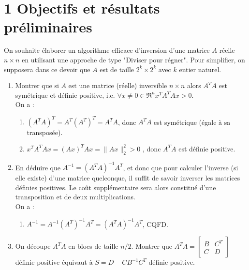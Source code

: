 \documentclass[a4paper,fleqn]{article}
\begin{document}
\section*{1 Objectifs et résultats préliminaires}

On souhaite élaborer un algorithme efficace d'inversion d'une matrice $A$ réelle $n \times n$ en utilisant une approche de type "Diviser pour régner". Pour simplifier, on supposera dans ce devoir que $A$ est de taille $2^{k} \times 2^{k}$ avec $k$ entier naturel.

\begin{enumerate}
  \item Montrer que si $A$ est une matrice (réelle) inversible $n \times n$ alors $A^{T} A$ est symétrique et définie positive, i.e. $\forall x \neq 0 \in \Re^{n} x^{T} A^{T} A x>0$.
   \\ On a :  
   \begin{enumerate} 
   \item $ (A^{T} A)^{T} = A^{T} (A^{T})^{T} = A^{T} A$, donc  $A^{T} A$ est symétrique (égale à sa transposée).
   \item $x^{T} A^{T} A x = (Ax)^{T}A x = \|Ax\|_2^2  > 0$ , donc $A^{T} A $ est définie positive.
  \end{enumerate}
    
  \item En déduire que $A^{-1}=\left(A^{T} A\right)^{-1} A^{T}$, et donc que pour calculer l'inverse (si elle existe) d'une matrice quelconque, il suffit de savoir inverser les matrices définies positives. Le coût supplémentaire sera alors constitué d'une transposition et de deux multiplications. \\ On a :  
   \begin{enumerate} 
   \item $ A^{-1} = A^{-1}(A^{T})^{-1}A^{T}= (A^{T} A)^{-1} A^{T}$,  CQFD.
  \end{enumerate}
    

  \item On découpe $A^{T} A$ en blocs de taille $n / 2$. Montrer que $A^{T} A=\left[\begin{array}{cc}B & C^{T} \\ C & D\end{array}\right]$ définie positive équivaut à $S=D-C B^{-1} C^{T}$ définie positive.
  
  \begin{enumerate}
  

\end{enumerate}
\end{enumerate}
\end{document}
